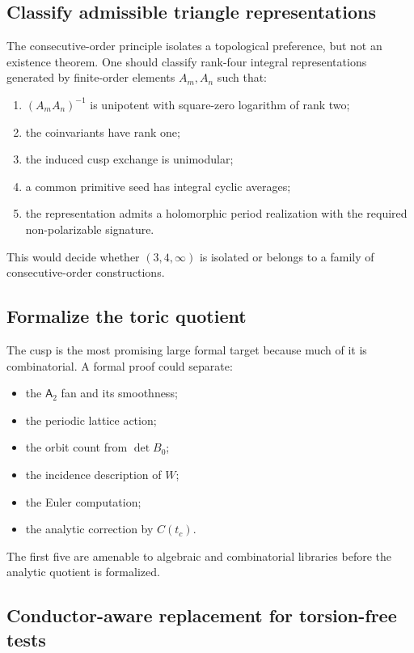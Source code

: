 \documentclass[11pt,reqno]{amsart}
\numberwithin{equation}{section}
\newcommand{\Aroot}{\mathsf{A}_2}
\theoremstyle{definition}
\begin{document}
\subsection{Classify admissible triangle representations}

The consecutive-order principle isolates a topological preference, but not an existence theorem. One should classify rank-four integral representations generated by finite-order elements $A_m,A_n$ such that:
\begin{enumerate}
\item $(A_mA_n)^{-1}$ is unipotent with square-zero logarithm of rank two;
\item the coinvariants have rank one;
\item the induced cusp exchange is unimodular;
\item a common primitive seed has integral cyclic averages;
\item the representation admits a holomorphic period realization with the required non-polarizable signature.
\end{enumerate}
This would decide whether $(3,4,\infty)$ is isolated or belongs to a family of consecutive-order constructions.

\subsection{Formalize the toric quotient}

The cusp is the most promising large formal target because much of it is combinatorial. A formal proof could separate:
\begin{itemize}
\item the $\Aroot$ fan and its smoothness;
\item the periodic lattice action;
\item the orbit count from $\det B_0$;
\item the incidence description of $W$;
\item the Euler computation;
\item the analytic correction by $C(t_c)$.
\end{itemize}
The first five are amenable to algebraic and combinatorial libraries before the analytic quotient is formalized.

\subsection{Conductor-aware replacement for torsion-free tests}
\end{document}
